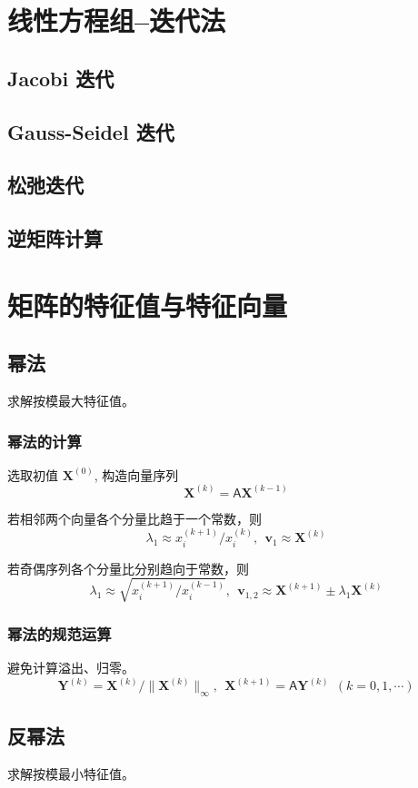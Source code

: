 \documentclass[a4paper,12pt]{article}
\begin{document}
\section{线性方程组--迭代法}
\subsection{Jacobi 迭代}

\subsection{Gauss-Seidel 迭代}

\subsection{松弛迭代}

\subsection{逆矩阵计算}

\section{矩阵的特征值与特征向量}
\subsection{幂法}
求解按模最大特征值。
\subsubsection{幂法的计算}
选取初值 $\mathbf{X}^{(0)}$, 构造向量序列
\[
\mathbf{X}^{(k)}=\mathsf{A}\mathbf{X}^{(k-1)}
\]\par
若相邻两个向量各个分量比趋于一个常数，则
\[
\lambda_1\approx x_i^{(k+1)}/x_i^{(k)},\ \ \mathbf{v}_1\approx\mathbf{X}^{(k)}
\]\par
若奇偶序列各个分量比分别趋向于常数，则
\[
\lambda_1\approx\sqrt{x_i^{(k+1)}/x_i^{(k-1)}},\ \ \mathbf{v}_{1,2}\approx\mathbf{X}^{(k+1)}\pm\lambda_1\mathbf{X}^{(k)}
\]
\subsubsection{幂法的规范运算}
避免计算溢出、归零。
\[
\mathbf{Y}^{(k)}=\mathbf{X}^{(k)}/\|\mathbf{X}^{(k)}\|_{\infty},\ \ \mathbf{X}^{(k+1)}=\mathsf{A}\mathbf{Y}^{(k)}\ \ (k=0,1,\cdots)
\]
\subsection{反幂法}
求解按模最小特征值。
\end{document}
